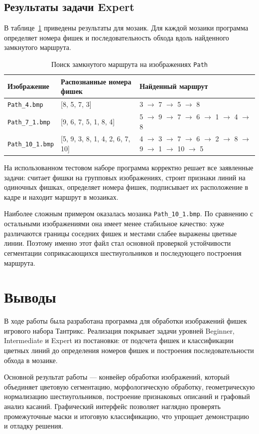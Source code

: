 \documentclass[12pt,a4paper]{article}
\begin{document}
\subsection{Результаты задачи Expert}
В таблице~\ref{tab:results-path} приведены результаты для мозаик. Для каждой мозаики программа определяет номера фишек и последовательность обхода вдоль найденного замкнутого маршрута.

\begin{table}[H]
    \centering
    \small
    \caption{Поиск замкнутого маршрута на изображениях \texttt{Path}}
    \label{tab:results-path}
    \begin{tabularx}{\textwidth}{l X X}
        \toprule
        Изображение & Распознанные номера фишек & Найденный маршрут \\
        \midrule
        \texttt{Path\_4.bmp} & [8, 5, 7, 3] & 3 $\rightarrow$ 7 $\rightarrow$ 5 $\rightarrow$ 8 \\
        \texttt{Path\_7\_1.bmp} & [9, 6, 7, 5, 1, 8, 4] & 5 $\rightarrow$ 9 $\rightarrow$ 7 $\rightarrow$ 6 $\rightarrow$ 1 $\rightarrow$ 4 $\rightarrow$ 8 \\
        \texttt{Path\_10\_1.bmp} & [5, 9, 3, 8, 1, 4, 2, 6, 7, 10] & 4 $\rightarrow$ 3 $\rightarrow$ 7 $\rightarrow$ 6 $\rightarrow$ 2 $\rightarrow$ 8 $\rightarrow$ 9 $\rightarrow$ 1 $\rightarrow$ 10 $\rightarrow$ 5 \\
        \bottomrule
    \end{tabularx}
\end{table}

На использованном тестовом наборе программа корректно решает все заявленные задачи: считает фишки на групповых изображениях, строит признаки линий на одиночных фишках, определяет номера фишек, подписывает их расположение в кадре и находит маршрут в мозаиках.

Наиболее сложным примером оказалась мозаика \texttt{Path\_10\_1.bmp}. По сравнению с остальными изображениями она имеет менее стабильное качество: хуже различаются границы соседних фишек и местами слабее выражены цветные линии. Поэтому именно этот файл стал основной проверкой устойчивости сегментации соприкасающихся шестиугольников и последующего построения маршрута.

\section{Выводы}
В ходе работы была разработана программа для обработки изображений фишек игрового набора Тантрикс. Реализация покрывает задачи уровней Beginner, Intermediate и Expert из постановки: от подсчета фишек и классификации цветных линий до определения номеров фишек и построения последовательности обхода в мозаике.

Основной результат работы --- конвейер обработки изображений, который объединяет цветовую сегментацию, морфологическую обработку, геометрическую нормализацию шестиугольников, построение признаковых описаний и графовый анализ касаний. Графический интерфейс позволяет наглядно проверять промежуточные маски и итоговую классификацию, что упрощает демонстрацию и отладку решения.
\end{document}
